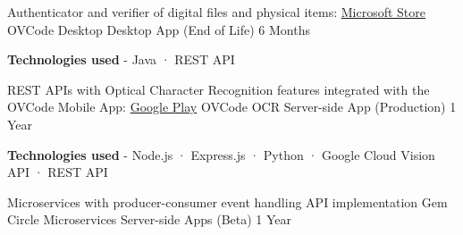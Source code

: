 \begin{cventries}
{\begin{cvitems}
      \end{cvitems}
    }
  \cventry
    {Authenticator and verifier of digital files and physical items: \href{https://www.microsoft.com/en-us/p/ovcode/9p2tlm03m56x}{Microsoft Store}} %
    {OVCode Desktop} %
    {Desktop App (End of Life)} %
    {6 Months} %
    {
      \begin{cvitems} %
        \item {\textbf{Technologies used} \hspace{0.03cm} - \hspace{0.03cm} Java \hspace{0.03cm} · \hspace{0.03cm} REST API \\}
      \end{cvitems}
    }
  \cventry
    {REST APIs with Optical Character Recognition features integrated with the OVCode Mobile App: \href{https://play.google.com/store/apps/details?id=com.nextix.ovcode}{Google Play}} %
    {OVCode OCR} %
    {Server-side App (Production)} %
    {1 Year} %
    {
      \begin{cvitems} %
        \item {\textbf{Technologies used} \hspace{0.03cm} - \hspace{0.03cm} Node.js \hspace{0.03cm} · \hspace{0.03cm} Express.js \hspace{0.03cm} · \hspace{0.03cm} Python \hspace{0.03cm} · \hspace{0.03cm} Google Cloud Vision API \hspace{0.03cm} · \hspace{0.03cm} REST API \\}
      \end{cvitems}
    }
  \cventry
    {Microservices with producer-consumer event handling API implementation} %
    {Gem Circle Microservices} %
    {Server-side Apps (Beta)} %
    {1 Year} %
    {
      \begin{cvitems} %

\end{cvitems}}
\end{cventries}
